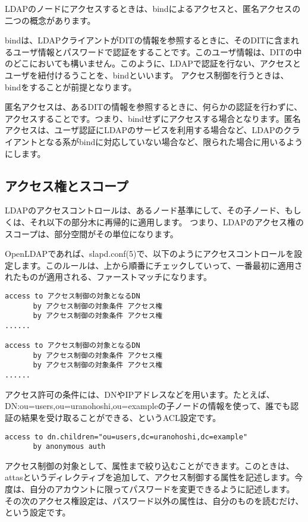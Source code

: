 LDAPのノードにアクセスするときは、bindによるアクセスと、匿名アクセスの二つの概念があります。

bindは、LDAPクライアントがDITの情報を参照するときに、そのDITに含まれるユーザ情報とパスワードで認証をすることです。このユーザ情報は、DITの中のどこにおいても構いません。このように、LDAPで認証を行ない、アクセスとユーザを紐付けるうことを、bindといいます。
アクセス制御を行うときは、bindをすることが前提となります。

匿名アクセスは、あるDITの情報を参照するときに、何らかの認証を行わずに、アクセスすることです。つまり、bindせずにアクセスする場合となります。匿名アクセスは、ユーザ認証にLDAPのサービスを利用する場合など、LDAPのクライアントとなる系がbindに対応していない場合など、限られた場合に用いるようにします。


\subsection{アクセス権とスコープ}

LDAPのアクセスコントロールは、あるノード基準にして、その子ノード、もしくは、それ以下の部分木に再帰的に適用します。
つまり、LDAPのアクセス権のスコープは、部分空間がその単位になります。

OpenLDAPであれば、slapd.conf(5)で、以下のようにアクセスコントロールを設定します。このルールは、上から順番にチェックしていって、一番最初に適用されたものが適用される、ファーストマッチになります。

\begin{verbatim}
access to アクセス制御の対象となるDN
　　　　by アクセス制御の対象条件 アクセス権
　　　　by アクセス制御の対象条件 アクセス権
......

access to アクセス制御の対象となるDN
　　　　by アクセス制御の対象条件 アクセス権
　　　　by アクセス制御の対象条件 アクセス権
......
\end{verbatim}

アクセス許可の条件には、DNやIPアドレスなどを用います。たとえば、DN:ou=users,ou=uranohoshi,ou=exampleの子ノードの情報を使って、誰でも認証の結果を受け取ることができる、というACL設定です。

\begin{verbatim}
access to dn.children="ou=users,dc=uranohoshi,dc=example"
　　　　by anonymous auth
\end{verbatim}

アクセス制御の対象として、属性まで絞り込むことができます。このときは、attasというディレクティブを追加して、アクセス制御する属性を記述します。今度は、自分のアカウントに限ってパスワードを変更できるように記述します。
その次のアクセス権設定は、パスワード以外の属性は、自分のものを読むだけ、という設定です。

